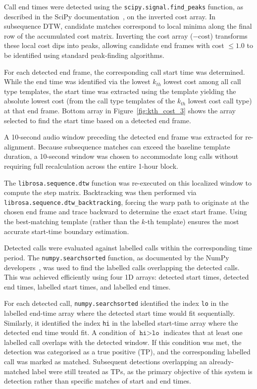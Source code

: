 Call end times were detected using the \texttt{scipy.signal.find\_peaks} function, as described in the SciPy documentation~\cite{find_peaks}, on the inverted cost array. In subsequence \ac{DTW}, candidate matches 
correspond to local minima along the final row of the accumulated cost matrix. Inverting the cost array ($-\text{cost}$) transforms these local cost dips into
peaks, allowing candidate end frames with cost $\leq 1.0$ to be identified using standard peak-finding algorithms.

For each detected end frame, the corresponding call start time was determined. While the end time was identified via the lowest $k_{th}$ lowest cost among all call type templates, 
the start time was 
extracted using the template yielding the absolute lowest cost (from the call type templates of the $k_{th}$ lowest cost call type) at that end frame. 
Bottom array in Figure~\ref{fig:kth_cost_3} shows the array selected to find the start time based on a detected end frame.

A 10-second audio window preceding the detected end frame was extracted for 
re-alignment. Because subsequence matches can exceed the baseline template duration, a 10-second window was chosen to accommodate long calls without requiring 
full recalculation across the entire 1-hour block.

The \texttt{librosa.sequence.dtw} function was re-executed on this localized window to compute the step matrix. 
Backtracking was then performed via \texttt{librosa.sequence.dtw\_backtracking}, forcing the warp path to originate at the chosen end frame and trace backward to determine the exact start 
frame. Using the best-matching template (rather than the $k$-th template) ensures the most accurate start-time boundary estimation.


\label{sec:matching-methodology}

Detected calls were evaluated against labelled calls within the corresponding time period. The \texttt{numpy.searchsorted} function, as documented 
by the NumPy developers~\cite{searchsorted}, was used to 
find the labelled calls overlapping the detected calls. This was achieved efficiently using four 1D arrays: detected start times, detected end times, labelled start times, and labelled end times. 

For each detected call, \texttt{numpy.searchsorted} identified the index \texttt{lo} in the labelled end-time array where the detected start time would 
fit sequentially. Similarly, it identified the index \texttt{hi} in the labelled start-time array where the detected end time would fit. A condition of 
$\texttt{hi} > \texttt{lo}$ indicates that at least one labelled call overlaps with the detected window. If this condition was met, the detection 
was categorised as a true positive (\acs{TP}), and the corresponding labelled call was marked as matched. Subsequent detections overlapping an already-matched 
label were still treated as \acsp{TP}, as the primary objective of this system is detection rather than specific matches of start and end times.


